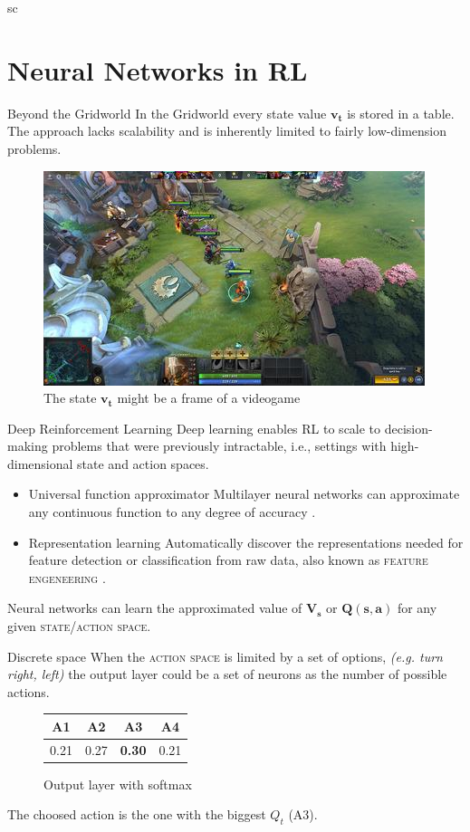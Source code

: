 \documentclass[10pt]{beamer}
\begin{document}
sc
\section{Neural Networks in RL}
\begin{frame}{Beyond the Gridworld}
	In the Gridworld every state value $\mathbf{v_t}$ is stored in a table. 
	The approach lacks scalability and is inherently limited to fairly low-dimension problems.
	\begin{figure}
		\includegraphics[scale=0.4]{img/dota2.jpg}
		\caption{The state $\mathbf{v_t}$ might be a frame of a videogame \cite{dota2}}
	\end{figure}
\end{frame}
\begin{frame}[fragile]{Deep Reinforcement Learning}
Deep  learning  enables  RL  to  scale  to  decision-making
problems  that  were  previously  intractable,  i.e.,  settings  with
high-dimensional  state  and  action  spaces. \cite{arulkumaran2017brief}
	\begin{itemize}
		\item \alert{Universal function approximator} Multilayer neural networks can approximate any continuous function to any degree of accuracy \cite{hornik1989multilayer}.
		\pause
		\item \alert{Representation learning} Automatically discover the representations needed for feature detection or classification from raw data, also known as \textsc{feature engeneering} \cite{bengio2013representation}.
	\end{itemize}
	Neural networks can learn the approximated value of $\mathbf{V_s}$ or $\mathbf{Q(s, a)}$ for any given \textsc{state/action space}.
\end{frame}

\begin{frame}{Discrete space}
	When the \textsc{action space} is limited by a set of options, \textit{(e.g. turn right, left)} the output layer could be a set of neurons as the number of possible actions.
	\begin{figure}
		\begin{tabular}{ |c|c|c|c| } 
		 \hline
			\textbf{A1} & \textbf{A2} & \textbf{A3} & \textbf{A4}  \\ [0.5ex] 
		 \hline
		 \hline
			 0.21 & 0.27 & \textbf{0.30} & 0.21 \\ 
		 \hline
		\end{tabular}
		\caption{Output layer with softmax}
	\end{figure}
	The choosed action is the one with the biggest $Q_t$ (\textsc{A3}).
\end{frame}
\end{document}
